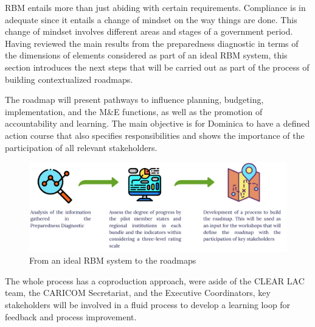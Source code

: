\documentclass[
]{book}
\begin{document}
RBM entails more than just abiding with certain requirements. Compliance is in adequate since it entails a change of mindset on the way things are done. This change of mindset involves different areas and stages of a government period. Having reviewed the main results from the preparedness diagnostic in terms of the dimensions of elements considered as part of an ideal RBM system, this section introduces the next steps that will be carried out as part of the process of building contextualized roadmaps.

The roadmap will present pathways to influence planning, budgeting, implementation, and the M\&E functions, as well as the promotion of accountability and learning. The main objective is for Dominica to have a defined action course that also specifies responsibilities and shows the importance of the participation of all relevant stakeholders.

\begin{figure}
\includegraphics[width=1\linewidth]{./images/figure_6} \caption{From an ideal RBM system to the roadmaps}\label{fig:figure6}
\end{figure}

The whole process has a coproduction approach, were aside of the CLEAR LAC team, the CARICOM Secretariat, and the Executive Coordinators, key stakeholders will be involved in a fluid process to develop a learning loop for feedback and process improvement.
\end{document}
